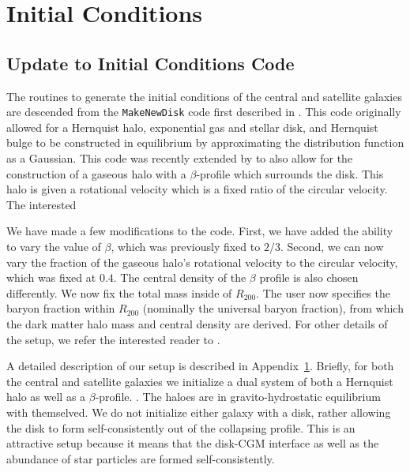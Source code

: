 \appendix

\section{Initial Conditions}\label{app:ics}
\subsection{Update to Initial Conditions Code}
The routines to generate the initial conditions of the central and satellite galaxies are descended from the \texttt{MakeNewDisk} code first described in \tocite. This code originally allowed for a Hernquist halo, exponential gas and stellar disk, and Hernquist bulge to be constructed in equilibrium by approximating the distribution function as a Gaussian. This code was recently extended by \citet{2023MNRAS.tmp.2070B} to also allow for the construction of a gaseous halo with a $\beta$-profile which surrounds the disk. This halo is given a rotational velocity which is a fixed ratio of the circular velocity. The interested 

We have made a few modifications to the \citet{2023MNRAS.tmp.2070B} code. First, we have added the ability to vary the value of $\beta$, which was previously fixed to $2/3$. Second, we can now vary the fraction of the gaseous halo's rotational velocity to the circular velocity, which was fixed at $0.4$. The central density of the $\beta$ profile is also chosen differently. We now fix the total mass inside of $R_{200}$. The user now specifies the baryon fraction within $R_{200}$ (nominally the universal baryon fraction), from which the dark matter halo mass and central density are derived. For other details of the setup, we refer the interested reader to \citet{2023MNRAS.tmp.2070B}.

A detailed description of our setup is described in Appendix~\ref{app:ics}. Briefly, for both the central and satellite galaxies we initialize a dual system of both a Hernquist halo as well as a $\beta$-profile. . The haloes are in gravito-hydrostatic equilibrium with themselved. We do not initialize either galaxy with a disk, rather allowing the disk to form self-consistently out of the collapsing profile. This is an attractive setup because it means that the disk-CGM interface as well as the abundance of star particles are formed self-consistently.

